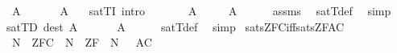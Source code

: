 \begin{isabellebody}
\ \ {\isachardoublequoteopen}A\ {\isasymTurnstile}\ {\isasymPhi}\ \ {\isasymequiv}\ \ {\isasymforall}{\isasymphi}{\isasymin}{\isasymPhi}{\isachardot}{\kern0pt}\ {\isacharparenleft}{\kern0pt}A{\isacharcomma}{\kern0pt}{\isacharbrackleft}{\kern0pt}{\isacharbrackright}{\kern0pt}\ {\isasymTurnstile}\ {\isasymphi}{\isacharparenright}{\kern0pt}{\isachardoublequoteclose}\isanewline
\isanewline
{}\isamarkupfalse%
\ satTI\ {\isacharbrackleft}{\kern0pt}intro{\isacharbang}{\kern0pt}{\isacharbrackright}{\kern0pt}{\isacharcolon}{\kern0pt}\ \isanewline
\ \ \ {\isachardoublequoteopen}{\isasymAnd}{\isasymphi}{\isachardot}{\kern0pt}\ {\isasymphi}{\isasymin}{\isasymPhi}\ {\isasymLongrightarrow}\ A{\isacharcomma}{\kern0pt}{\isacharbrackleft}{\kern0pt}{\isacharbrackright}{\kern0pt}\ {\isasymTurnstile}\ {\isasymphi}{\isachardoublequoteclose}\isanewline
\ \ \ {\isachardoublequoteopen}A\ {\isasymTurnstile}\ {\isasymPhi}{\isachardoublequoteclose}\isanewline
%
\isadelimproof
\ \ %
\endisadelimproof
%
\isatagproof
{}\isamarkupfalse%
\ assms\ \isamarkupfalse%
\ satT{\isacharunderscore}{\kern0pt}def\ \isamarkupfalse%
\ simp%
\endisatagproof
{\isafoldproof}%
%
\isadelimproof
\isanewline
%
\endisadelimproof
\isanewline
{}\isamarkupfalse%
\ satTD\ {\isacharbrackleft}{\kern0pt}dest{\isacharbrackright}{\kern0pt}\ {\isacharcolon}{\kern0pt}{\isachardoublequoteopen}A\ {\isasymTurnstile}\ {\isasymPhi}\ {\isasymLongrightarrow}\ \ {\isasymphi}{\isasymin}{\isasymPhi}\ {\isasymLongrightarrow}\ A{\isacharcomma}{\kern0pt}{\isacharbrackleft}{\kern0pt}{\isacharbrackright}{\kern0pt}\ {\isasymTurnstile}\ {\isasymphi}{\isachardoublequoteclose}\isanewline
%
\isadelimproof
\ \ %
\endisadelimproof
%
\isatagproof
{}\isamarkupfalse%
\ satT{\isacharunderscore}{\kern0pt}def\ \isamarkupfalse%
\ simp%
\endisatagproof
{\isafoldproof}%
%
\isadelimproof
\isanewline
%
\endisadelimproof
\isanewline
{}\isamarkupfalse%
\ sats{\isacharunderscore}{\kern0pt}ZFC{\isacharunderscore}{\kern0pt}iff{\isacharunderscore}{\kern0pt}sats{\isacharunderscore}{\kern0pt}ZF{\isacharunderscore}{\kern0pt}AC{\isacharcolon}{\kern0pt}\ \isanewline
\ \ {\isachardoublequoteopen}{\isacharparenleft}{\kern0pt}N\ {\isasymTurnstile}\ ZFC{\isacharparenright}{\kern0pt}\ {\isasymlongleftrightarrow}\ {\isacharparenleft}{\kern0pt}N\ {\isasymTurnstile}\ ZF{\isacharparenright}{\kern0pt}\ {\isasymand}\ {\isacharparenleft}{\kern0pt}N{\isacharcomma}{\kern0pt}\ {\isacharbrackleft}{\kern0pt}{\isacharbrackright}{\kern0pt}\ {\isasymTurnstile}\ AC{\isacharparenright}{\kern0pt}{\isachardoublequoteclose}\isanewline

\end{isabellebody}
